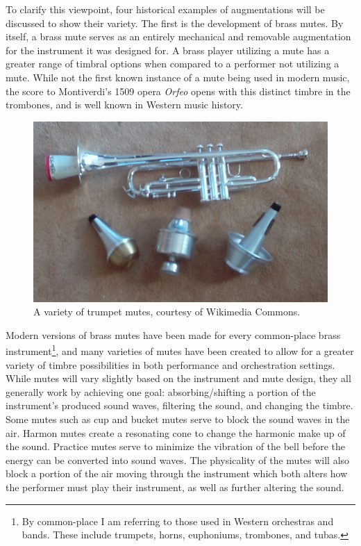 To clarify this viewpoint, four historical examples of augmentations will be discussed to show their variety. The first is the development of brass mutes. By itself, a brass mute serves as an entirely mechanical and removable augmentation for the instrument it was designed for. A brass player utilizing a mute has a greater range of timbral options when compared to a performer not utilizing a mute. While not the first known instance of a mute being used in modern music, the score to Montiverdi's 1509 opera \textit{Orfeo} opens with this distinct timbre in the trombones, and is well known in Western music history.

\begin{figure}
    \centering
    \includegraphics[scale=0.35]{diagrams/TrumpetMutes.jpg}
    \caption{A variety of trumpet mutes, courtesy of Wikimedia Commons.} %
    \label{fig:tptmutes}
\end{figure}

Modern versions of brass mutes have been made for every common-place brass instrument\footnote{By common-place I am referring to those used in Western orchestras and bands. These include trumpets, horns, euphoniums, trombones, and tubas.}, and many varieties of mutes have been created to allow for a greater variety of timbre possibilities in both performance and orchestration settings. While mutes will vary slightly based on the instrument and mute design, they all generally work by achieving one goal: absorbing/shifting a portion of the instrument's produced sound waves, filtering the sound, and changing the timbre. Some mutes such as cup and bucket mutes serve to block the sound waves in the air. Harmon mutes create a resonating cone to change the harmonic make up of the sound\cite{brassMutes1982}. Practice mutes serve to minimize the vibration of the bell before the energy can be converted into sound waves. The physicality of the mutes will also block a portion of the air moving through the instrument which both alters how the performer must play their instrument, as well as further altering the sound\cite{brassMutes1982}.

